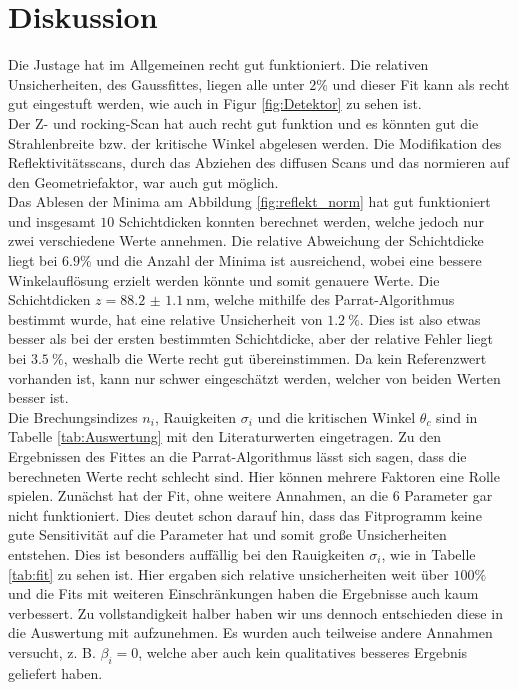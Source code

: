 \section{Diskussion}
Die Justage hat im Allgemeinen recht gut funktioniert. Die relativen Unsicherheiten, des Gaussfittes, liegen alle unter $ 2\%$ und dieser Fit kann als recht gut eingestuft werden, wie auch in Figur \ref{fig:Detektor} zu sehen ist. \\
Der Z- und rocking-Scan hat auch recht gut funktion und es könnten gut die Strahlenbreite bzw. der kritische Winkel abgelesen werden.
Die Modifikation des Reflektivitätsscans, durch das Abziehen des diffusen Scans und das normieren auf den Geometriefaktor, war auch gut möglich.\\
Das Ablesen der Minima am Abbildung \ref{fig:reflekt_norm} hat gut funktioniert und insgesamt $10$ Schichtdicken konnten berechnet werden, welche jedoch nur zwei verschiedene Werte annehmen. 
Die relative Abweichung der Schichtdicke liegt bei $6.9\%$ und die Anzahl der Minima ist ausreichend, wobei eine bessere Winkelauflösung erzielt werden könnte und somit genauere Werte.
Die Schichtdicken $z = \SI{88.2(11)}{\nm}$, welche mithilfe des Parrat-Algorithmus bestimmt wurde, hat eine relative Unsicherheit von $\SI{1.2}{\percent}$. Dies ist also etwas besser als bei der ersten bestimmten Schichtdicke, aber der relative Fehler liegt bei $\SI{3.5}{\percent}$, weshalb die Werte recht gut übereinstimmen.
Da kein Referenzwert vorhanden ist, kann nur schwer eingeschätzt werden, welcher von beiden Werten besser ist. 
\\
Die Brechungsindizes $n_i$, Rauigkeiten $\sigma_i$ und die kritischen Winkel $\theta_c$ sind in Tabelle \ref{tab:Auswertung} mit den Literaturwerten eingetragen.
Zu den Ergebnissen des Fittes an die Parrat-Algorithmus lässt sich sagen, dass die berechneten Werte recht schlecht sind. Hier können mehrere Faktoren eine Rolle spielen. Zunächst hat der Fit, ohne weitere Annahmen, an die $6$ Parameter gar nicht funktioniert. Dies deutet schon darauf hin, dass das Fitprogramm keine gute Sensitivität auf die Parameter hat und somit große Unsicherheiten entstehen.
Dies ist besonders auffällig bei den Rauigkeiten $\sigma_i$, wie in Tabelle \ref{tab:fit} zu sehen ist. Hier ergaben sich relative unsicherheiten weit über $100\%$ und die Fits mit weiteren Einschränkungen haben die Ergebnisse auch kaum verbessert. Zu vollstandigkeit halber haben wir uns dennoch entschieden diese in die Auswertung mit aufzunehmen. Es wurden auch teilweise andere Annahmen versucht, z. B. $\beta_i = 0$, welche aber auch kein qualitatives besseres Ergebnis geliefert haben.
